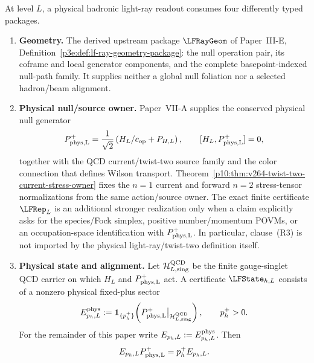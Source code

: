 \documentclass[12pt,a4paper]{article}
\begin{document}
\begin{definition}
\label{p11:def:hadronic-distribution-package}
At level \(L\), a physical hadronic light-ray readout consumes four differently typed
packages.
\begin{enumerate}[label=\textnormal{(LF-\Alph*)},leftmargin=3.6em]
\item \textbf{Geometry.}
The derived upstream package \(\LFRayGeom\) of Paper~III-E,
Definition~\ref{p3e:def:lf-ray-geometry-package}: the null operation pair,
its coframe and local generator components, and the complete basepoint-indexed
null-path family.  It supplies neither a global null foliation nor a selected
hadron/beam alignment.
\item \textbf{Physical null/source owner.}
Paper~VII-A supplies the conserved physical null generator
\begin{equation}
\label{p11:eq:v264-physical-plus-owner}
 P_{\rm phys,L}^+
 =\frac1{\sqrt2}\left(H_L/c_{\rm op}+P_{H,L}\right),
 \qquad [H_L,P_{\rm phys,L}^+]=0,
\end{equation}
together with the QCD current/twist-two source family and the color connection
that defines Wilson transport.  Theorem~\ref{p10:thm:v264-twist-two-current-stress-owner}
fixes the \(n=1\) current and forward \(n=2\) stress-tensor normalizations from
the same action/source owner.  The exact finite certificate \(\LFRep_L\) is an
additional stronger realization only when a claim explicitly asks for the
species/Fock simplex, positive number/momentum POVMs, or an occupation-space
identification with \(P_{\rm phys,L}^+\).  In particular, clause~\textnormal{(R3)}
is not imported by the physical light-ray/twist-two definition itself.
\item \textbf{Physical state and alignment.}
Let \(\mathcal H_{L,\rm sing}^{\rm QCD}\) be the finite gauge-singlet QCD carrier
on which \(H_L\) and \(P_{\rm phys,L}^+\) act.  A certificate
\(\LFState_{h,L}\) consists of a nonzero physical fixed-plus sector
\begin{equation}
\label{p11:eq:v264-physical-fixed-plus-sector}
 E^{\rm phys}_{p_h,L}
 :=\mathbf1_{\{p_h^+\}}
 \!\left(P_{\rm phys,L}^+\big|_{\mathcal H_{L,\rm sing}^{\rm QCD}}\right),
 \qquad p_h^+>0.
\end{equation}
For the remainder of this paper write \(E_{p_h,L}:=E^{\rm phys}_{p_h,L}\).  Then
\begin{equation}
\label{p11:eq:lf-fixed-total-plus-sector}
 E_{p_h,L}P_{\rm phys,L}^+=p_h^+E_{p_h,L}.

\end{equation}
\end{enumerate}
\end{definition}
\end{document}
